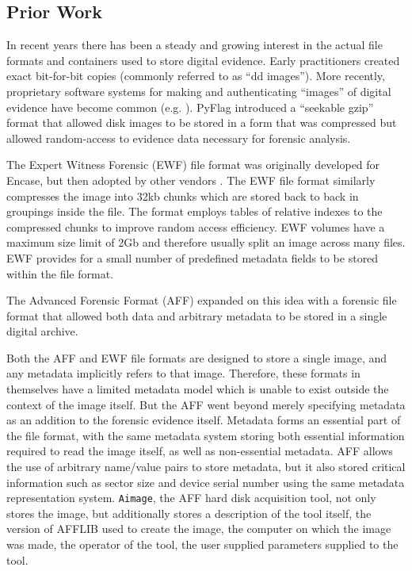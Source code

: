 \documentclass[10pt, conference]{IEEEtran}
\begin{document}
\subsection{Prior Work}
In recent years there has been a steady and growing interest in the
actual file formats and containers used to store digital
evidence. Early practitioners created exact bit-for-bit copies
(commonly referred to as ``dd images''). More recently, proprietary
software systems for making and authenticating ``images'' of digital
evidence have become common
(e.g. \cite{safeback,ilook,encase}). PyFlag\cite{pyflag} introduced a
``seekable gzip'' format that allowed disk images to be stored in a
form that was compressed but allowed random-access to evidence data
necessary for forensic analysis. 

The Expert Witness Forensic (EWF) file format was originally developed
for Encase\cite{encase}, but then adopted by other vendors
\cite{libewf}. The EWF file format similarly compresses the image into 32kb
chunks which are stored back to back in groupings inside the file. The
format employs tables of relative indexes to the
compressed chunks to improve random access efficiency. EWF volumes
have a maximum size limit of 2Gb and therefore usually split an image across
many files. EWF provides for a small number of predefined metadata
fields to be stored within the file format.

The Advanced Forensic Format (AFF) expanded on this idea with a
forensic file format that allowed both data and arbitrary metadata to
be stored in a single digital archive\cite{garfinkel:aff}. 

Both the AFF and EWF file formats are designed to store a single
image, and any metadata implicitly refers to that image. Therefore,
these formats in themselves have a limited metadata model which is
unable to exist outside the context of the image itself.  But the AFF went
beyond merely specifying metadata as an addition to the forensic
evidence itself. Metadata forms an essential part of the file format,
with the same metadata system storing both essential information
required to read the image itself, as well as non-essential
metadata. AFF allows the use of arbitrary name/value pairs to store
metadata, but it also stored critical information such as sector size
and device serial number using the same metadata representation
system. \verb+Aimage+, the AFF hard disk acquisition tool, not only
stores the image, but additionally stores a description of the tool
itself, the version of AFFLIB used to create the image, the computer
on which the image was made, the operator of the tool, the user
supplied parameters supplied to the tool.
\end{document}
